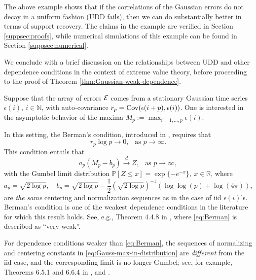 The above example shows that if the correlations of the Gaussian errors do not decay in a uniform fashion (UDD fails), then we can do substantially better in terms of support recovery.
The claims in the example are verified in Section \ref{suppsec:proofs}, while numerical simulations of this example can be found in Section \ref{suppsec:numerical}.

\medskip

We conclude with a brief discussion on the relationships between UDD and other dependence conditions in the context of extreme value theory, before proceeding to the proof of Theorem \ref{thm:Gaussian-weak-dependence}.

Suppose that the array of errors  ${\cal E}$ comes from a stationary Gaussian time series $\epsilon(i),\ i\in \mathbb{N}$, with auto-covariance $r_p={\rm {Cov}}(\epsilon(i+p),\epsilon(i))$. 
One is interested in the asymptotic behavior of the maxima $M_p:=\max_{i=1,\dots,p} \epsilon(i)$.

In this setting, the Berman's condition, introduced in \cite{berman1964limit}, requires that
\begin{equation} \label{eq:Berman}
    r_p \log p \to 0,\ \ \mbox{ as }p\to\infty.
\end{equation}
This condition entails that 
\begin{equation}
    \label{eq:Gauss-max-in-distribution}
  a_p (M_p - b_p) \stackrel{d}{\longrightarrow } Z,\  \ \mbox{ as }p\to\infty,
\end{equation}
with the Gumbel limit distribution $\mathbb P [Z\le x] = \exp\{-e^{-x}\},\ x\in \mathbb R$, 
where 
$$
a_p = \sqrt{2\log p},\quad b_p  = \sqrt{2\log p} - \frac{1}{2}\left(\sqrt{2\log p}\right)^{-1}\left(\log \log (p) + \log(4\pi)\right),
$$ 
are {\em the same} centering and normalization sequences
as in the case of iid $\epsilon(i)$'s.  
Berman's condition is one of the weakest dependence conditions  in the literature for which this result holds. See, e.g., Theorem 4.4.8 in \cite{embrechts2013modelling}, where \eqref{eq:Berman} is described as ``very weak''.

For dependence conditions weaker than \eqref{eq:Berman}, the sequences of normalizing and centering constants in \eqref{eq:Gauss-max-in-distribution} are {\em different} from the iid case, and the corresponding limit is no longer Gumbel; see, for example, Theorems 6.5.1 and  6.6.4 in \cite{leadbetter2012extremes}, and \cite{mccormick1976weak}. 

